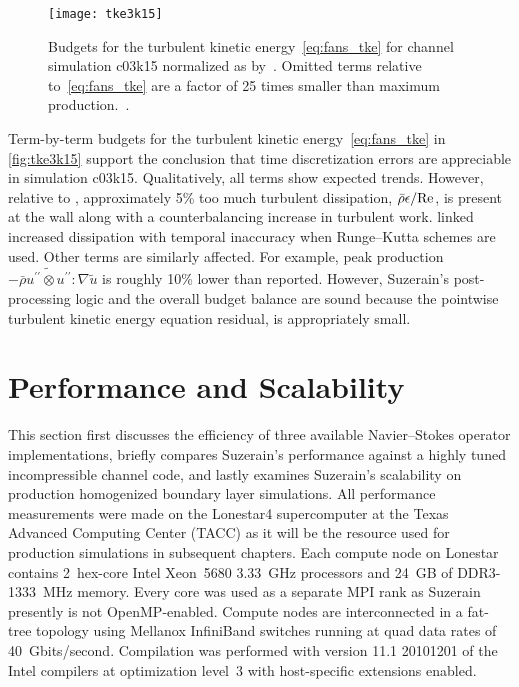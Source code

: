 \begin{figure}[tb]
\centering
\texttt{[image: tke3k15]}
\caption[Turbulent kinetic energy budgets for $\Reynolds=3000$, $\Mach=1.5$ channel]{%
    Budgets for the turbulent kinetic energy~\eqref{eq:fans_tke}
    for channel simulation c03k15 normalized as by~\citet[figure
    16a]{Huang1995Compressible}.  Omitted terms relative
    to~\eqref{eq:fans_tke} are a factor of 25 times smaller than maximum
    production.~\cite{Guarini2000Direct}\label{fig:tke3k15}.
}
\end{figure}

Term-by-term budgets for the turbulent kinetic energy~\eqref{eq:fans_tke}
in \autoref{fig:tke3k15} support the conclusion that time
discretization errors are appreciable in simulation c03k15.  Qualitatively, all
terms show expected trends.  However, relative to \citet[Figure
16a]{Huang1995Compressible}, approximately 5\% too much turbulent dissipation,
$\bar{\rho}\epsilon/\mbox{Re}_{}$, is present at the wall along with a
counterbalancing increase in turbulent work.  \citet{Coleman2010Primer} linked
increased dissipation with temporal inaccuracy when Runge--Kutta schemes are
used.  Other terms are similarly affected.  For example, peak production $-\bar{\rho}
\widetilde{u^{\prime\prime}\otimes{}u^{\prime\prime}} : \nabla\tilde{u}$ is
roughly 10\% lower than \citeauthor{Huang1995Compressible} reported.
However, Suzerain's post-processing logic and the overall budget balance
are sound because the pointwise turbulent kinetic energy equation residual,
is appropriately small.


\section{Performance and Scalability}
\label{sec:performance}

This section first discusses the efficiency of three available Navier--Stokes
operator implementations, briefly compares Suzerain's performance against a
highly tuned incompressible channel code, and lastly examines Suzerain's
scalability on production homogenized boundary layer simulations.  All
performance measurements were made on the Lonestar4 supercomputer at the Texas
Advanced Computing Center (TACC) as it will be the resource used for
production simulations in subsequent chapters.  Each compute node on Lonestar
contains 2~hex-core Intel\textsuperscript{\textregistered} Xeon\textsuperscript{\textregistered}~5680 3.33~GHz
processors and 24~GB of DDR3-1333~MHz memory.  Every core was used as a separate
MPI rank as Suzerain presently is not OpenMP-enabled.  Compute nodes are
interconnected in a fat-tree topology using Mellanox\textsuperscript{\textregistered}
InfiniBand\textsuperscript{\texttrademark} switches running at quad data rates of 40~Gbits/second.
Compilation was performed with version 11.1 20101201 of the
Intel\textsuperscript{\textregistered} compilers at optimization level~3 with host-specific
extensions enabled.

